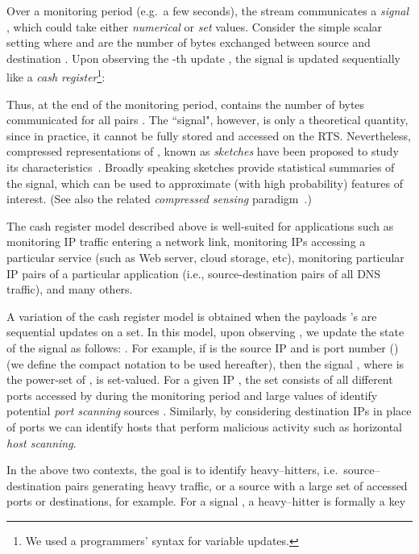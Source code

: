 \documentclass[10pt, conference, letterpaper,onecolumn]{IEEEtranv1.8}
\theoremstyle{plain}\newtheorem{thm}{Theorem}\newtheorem{lem}{Lemma}
\theoremstyle{definition}
\begin{document}
Over a monitoring period (e.g.\ a few seconds), the stream communicates a {\em signal} , which could
take either {\em numerical} or {\em set} values. Consider the simple scalar setting where  and
 are the number of bytes exchanged between source  and destination . Upon observing the -th update , 
the signal  is updated sequentially like a {\em cash register}\footnote{We used a programmers' syntax for  variable updates.}:

Thus, at the end of the monitoring period,   contains the number of bytes communicated for all pairs . 
The ``signal", however, is only a theoretical quantity, since in practice, it cannot be fully stored and accessed on the RTS. Nevertheless, compressed representations of , 
known as {\em sketches} have been proposed to study its characteristics~\cite{Cormode:2005:IDS:1073713.1073718, Cormode:2003:FHH:1315451.1315492, Cormode:2004:HUS:1007568.1007575, Gilbert06algorithmiclinear, Krishnamurthy:2003:SCD:948205.948236, 4146856, 1354567, 2190032, Cormode1061325,  Porat:2012:STM:2095116.2095212, doi:10.1137/100816705}. Broadly speaking sketches 
provide statistical summaries of the signal, which can be used to approximate (with high probability) features of interest.  (See also 
the related {\em compressed sensing} paradigm~\cite{4385788, Gilbert:2007:OSF:1250790.1250824, 1614066, Indyk:2008:ECC:1347082.1347086}.)

The cash register model described above is well-suited for applications such as  
monitoring IP traffic entering a network link, monitoring IPs accessing a particular service (such as Web server, cloud storage, etc), monitoring 
particular IP pairs of a particular application (i.e., source-destination pairs of all DNS traffic), and many others. 

A variation of the cash register model is obtained when the payloads 's are sequential updates
on a set. In this model, upon observing , we update the state of the signal as follows:
. For example, if  is the source IP and
 is port number ()
(we define the compact notation  to be used hereafter), then the signal , where  is the power-set of ,  is set-valued.
For a given IP , the set  consists of all different ports accessed by  during the monitoring  period and
large values of  identify potential {\em port scanning} sources .
Similarly, by considering destination IPs in place of ports we can identify hosts that perform
malicious activity such as horizontal \emph{host scanning}.

In the above two contexts, the goal is to identify heavy--hitters, i.e.\ source--destination pairs generating heavy traffic, or a source 
with a large set of accessed ports or destinations, for example.  For a signal , a heavy--hitter is formally
a key 
\end{document}
